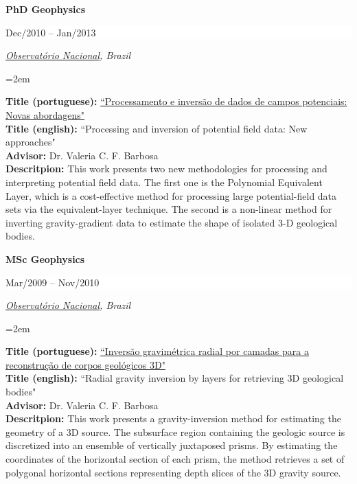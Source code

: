 \documentclass[paper=letter,fontsize=11pt]{scrartcl} %
\newcommand{\sepspace}{\vspace*{1em}}		%
\newcommand{\EducationEntry}[4]{
		\noindent \textbf{#1} \hfill      %
		\colorbox{White}{%
			\parbox{10em}{%
			\hfill\color{Black}#2}} \par  %
		\noindent \textit{#3} \par        %
		\noindent\hangindent=2em\hangafter=0 \small #4 %
		\normalsize \par}
\begin{document}
\EducationEntry{\Large PhD Geophysics}{\begin{flushright} Dec/2010 -- Jan/2013 \end{flushright} \vspace{-0.2in}}{\href{http://www.on.br/index.php/pt-br/}{Observat\'{o}rio Nacional}, Brazil}

\sepspace \noindent
\textbf{Title (portuguese):} \href{http://www.pinga-lab.org/thesis/oliveira-jr-phd.html}{``Processamento e invers\~{a}o de dados de campos potenciais: Novas abordagens"} \\
\textbf{Title (english):} ``Processing and inversion of potential field data: New approaches" \\
\textbf{Advisor:} Dr. Valeria C. F. Barbosa \\
\textbf{Descritpion:} This work presents two new methodologies for processing and interpreting potential field data. The first one is the Polynomial Equivalent Layer, which is a cost-effective method for processing large potential-field data sets via the equivalent-layer technique. The second is a non-linear method for inverting gravity-gradient data to estimate the shape of isolated 3-D geological bodies.

\sepspace

\EducationEntry{\Large MSc Geophysics}{\begin{flushright} Mar/2009 -- Nov/2010 \end{flushright} \vspace{-0.2in}}{\href{http://www.on.br/index.php/pt-br/}{Observat\'{o}rio Nacional}, Brazil}

\sepspace \noindent
\textbf{Title (portuguese):} \href{http://www.pinga-lab.org/thesis/oliveira-jr-msc.html}{``Invers\~{a}o gravim\'{e}trica radial por camadas para a reconstru\c{c}\~{a}o de corpos geol\'{o}gicos 3D"} \\
\textbf{Title (english):} ``Radial gravity inversion by layers for retrieving 3D geological bodies" \\
\textbf{Advisor:} Dr. Valeria C. F. Barbosa \\
\textbf{Descritpion:} This work presents a gravity-inversion method for estimating the geometry of a 3D source. The subsurface region containing the geologic source is discretized into an ensemble of vertically juxtaposed prisms. By estimating the coordinates of the horizontal section of each prism, the method retrieves a set of polygonal horizontal sections representing depth slices of the 3D gravity source.
\end{document}
